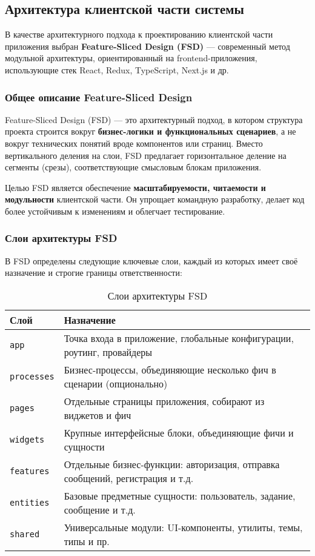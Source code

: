 \subsection{Архитектура клиентской части системы}

В качестве архитектурного подхода к проектированию клиентской части приложения выбран \textbf{Feature-Sliced Design (FSD)} — современный метод модульной архитектуры, ориентированный на frontend-приложения, использующие стек React, Redux, TypeScript, Next.js и др.

\subsubsection{Общее описание Feature-Sliced Design}

Feature-Sliced Design (FSD) — это архитектурный подход, в котором структура проекта строится вокруг \textbf{бизнес-логики и функциональных сценариев}, а не вокруг технических понятий вроде компонентов или страниц. Вместо вертикального деления на слои, FSD предлагает горизонтальное деление на сегменты (срезы), соответствующие смысловым блокам приложения.

Целью FSD является обеспечение \textbf{масштабируемости, читаемости и модульности} клиентской части. Он упрощает командную разработку, делает код более устойчивым к изменениям и облегчает тестирование.

\subsubsection{Слои архитектуры FSD}

В FSD определены следующие ключевые слои, каждый из которых имеет своё назначение и строгие границы ответственности:

\begin{table}[H]
\centering
\caption{Слои архитектуры FSD}
\begin{tabular}{|p{3cm}|p{11cm}|}
\hline
\textbf{Слой} & \textbf{Назначение} \\
\hline
\texttt{app} & Точка входа в приложение, глобальные конфигурации, роутинг, провайдеры \\
\hline
\texttt{processes} & Бизнес-процессы, объединяющие несколько фич в сценарии (опционально) \\
\hline
\texttt{pages} & Отдельные страницы приложения, собирают из виджетов и фич \\
\hline
\texttt{widgets} & Крупные интерфейсные блоки, объединяющие фичи и сущности \\
\hline
\texttt{features} & Отдельные бизнес-функции: авторизация, отправка сообщений, регистрация и т.д. \\
\hline
\texttt{entities} & Базовые предметные сущности: пользователь, задание, сообщение и т.д. \\
\hline
\texttt{shared} & Универсальные модули: UI-компоненты, утилиты, темы, типы и пр. \\
\hline
\end{tabular}
\end{table}

